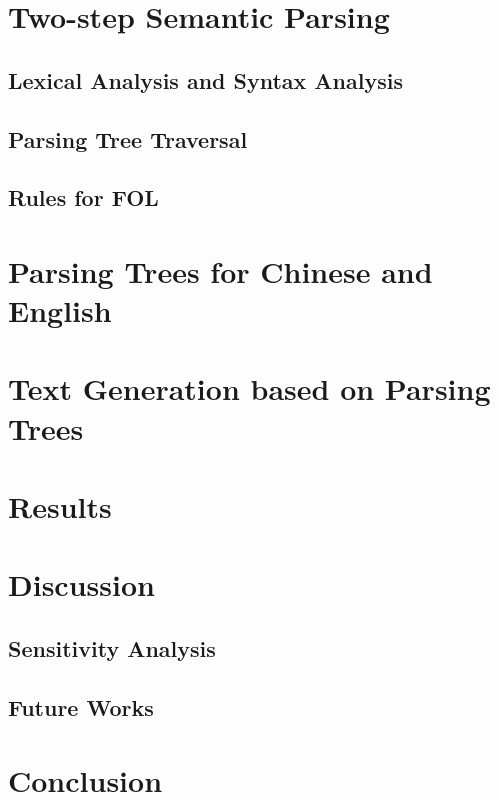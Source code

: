 \documentclass{article}
\begin{document}
\section{Two-step Semantic Parsing}{
	\subsection{Lexical Analysis and Syntax Analysis}{}

	\subsection{Parsing Tree Traversal}{}

	\subsection{Rules for FOL}{}
}

\section{Parsing Trees for Chinese and English}{}

\section{Text Generation based on Parsing Trees}{}

\section{Results}{}

\section{Discussion}{
	\subsection{Sensitivity Analysis}{}

	\subsection{Future Works}{}
}

\section{Conclusion}{}



\citation
\end{document}
